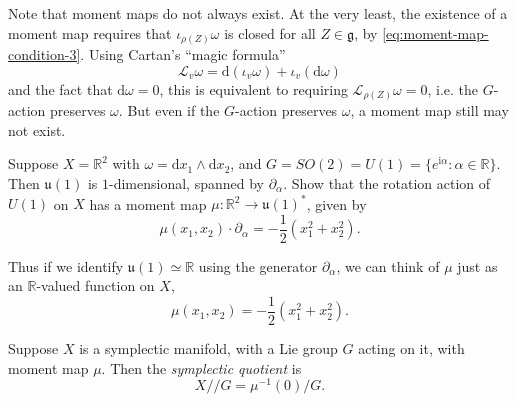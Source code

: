 \documentclass[12pt,letterpaper,reqno]{article}
\numberwithin{equation}{section}
\newcommand{\fg}{{\mathfrak g}}
\newcommand{\fu}{{\mathfrak u}}
\newcommand{\cL}{\ensuremath{\mathcal L}}
\newcommand{\R}{\ensuremath{\mathbb R}}
\newcommand{\half}{\ensuremath{\frac{1}{2}}}
\newcommand{\kq}{/\!\!/}
\newcommand{\I}{{\mathrm i}}
\newcommand{\de}{\mathrm{d}}
\newcommand{\ti}[1]{\textit{#1}}
\begin{document}
Note that moment maps do not always exist.
At the very least, the existence of a moment
map requires that $\iota_{\rho(Z)} \omega$ is closed
for all $Z \in \fg$, by \eqref{eq:moment-map-condition-3}. Using 
Cartan's ``magic formula''
\begin{equation} \label{eq:cartan-magic-formula}
  \cL_v \omega = \de (\iota_v \omega) + \iota_v (\de \omega)
\end{equation}
and the fact that $\de \omega = 0$,
this is equivalent to requiring $\cL_{\rho(Z)}\omega = 0$,
i.e. the $G$-action preserves $\omega$.
But even if the $G$-action preserves $\omega$,
a moment map still may not exist.

\begin{exercise}
Suppose $X = \R^2$ with $\omega = \de x_1 \wedge \de x_2$, and
$G = SO(2) = U(1) = \{e^{\I \alpha}: \alpha \in \R \}$.
Then $\fu(1)$ is $1$-dimensional, spanned by $\partial_\alpha$.
Show that the rotation action of $U(1)$ on $X$ 
has a moment map $\mu: \R^2 \to \fu(1)^*$, given by
\begin{equation}
  \mu(x_1,x_2) \cdot \partial_\alpha = -\half (x_1^2 + x_2^2).
\end{equation}
\end{exercise}
Thus if we identify $\fu(1) \simeq \R$ using the generator
$\partial_\alpha$, we can think of $\mu$ just as an $\R$-valued function
on $X$,
\begin{equation}
  \mu(x_1,x_2) = -\half (x_1^2 + x_2^2).
\end{equation}

\begin{defn}
Suppose $X$ is a symplectic manifold, with a Lie group $G$
acting on it, with moment map $\mu$. Then the \ti{symplectic quotient}
is
\begin{equation}
  X \kq G = \mu^{-1}(0) / G.
\end{equation}
\end{defn}
\end{document}
